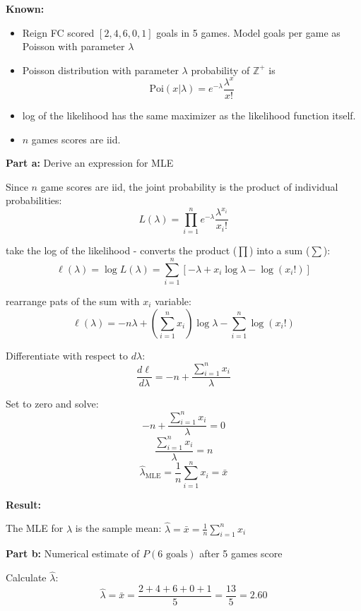\documentclass{article}
\begin{document}
\textbf{Known:}
\begin{itemize}
    \item Reign FC scored $[2, 4, 6, 0, 1]$ goals in 5 games. Model goals per game as Poisson with parameter $\lambda$
    \item Poisson distribution with parameter $\lambda$ probability of $\mathbb{Z}^+$ is
    \[
        \text{Poi}(x|\lambda) = e^{-\lambda} \frac{\lambda^x}{x!}
    \]
    \item log of the likelihood has the same maximizer as the likelihood function itself.
    \item $n$ games scores are iid.
\end{itemize}

\begin{mdframed}
\textbf{\large Part a:} Derive an expression for MLE
\end{mdframed}

Since $n$ game scores are iid, the joint probability is the product of individual probabilities:
\[
    L(\lambda) = \prod_{i=1}^{n} e^{-\lambda} \frac{\lambda^{x_i}}{x_i!}
\]

take the log of the likelihood - converts the product ($\prod$) into a sum ($\sum$):
\[
    \ell(\lambda) = \log L(\lambda) = \sum_{i=1}^{n} \left[ -\lambda + x_i \log \lambda - \log(x_i!) \right]
\]

rearrange pats of the sum with $x_i$ variable:
\[
    \ell(\lambda) = -n\lambda + \left(\sum_{i=1}^{n} x_i\right) \log \lambda - \sum_{i=1}^{n} \log(x_i!)
\]

Differentiate with respect to $d\lambda$:
\[
    \frac{d\ell}{d\lambda} = -n + \frac{\sum_{i=1}^{n} x_i}{\lambda}
\]

Set to zero and solve:
\[
    -n + \frac{\sum_{i=1}^{n} x_i}{\lambda} = 0
\]
\[
    \frac{\sum_{i=1}^{n} x_i}{\lambda} = n
\]
\[
    \hat{\lambda}_{\text{MLE}} = \frac{1}{n} \sum_{i=1}^{n} x_i = \bar{x}
\]

\textbf{Result:}

The MLE for $\lambda$ is the sample mean: $\boxed{\hat{\lambda} = \bar{x} = \frac{1}{n}\sum_{i=1}^{n} x_i}$

\bigskip
\begin{mdframed}
\textbf{\large Part b:} Numerical estimate of $P(6 \text{ goals})$ after 5 games score
\end{mdframed}

Calculate $\hat{\lambda}$:
\[
    \hat{\lambda} = \bar{x} = \frac{2+4+6+0+1}{5} = \frac{13}{5} = 2.60
\]
\end{document}
